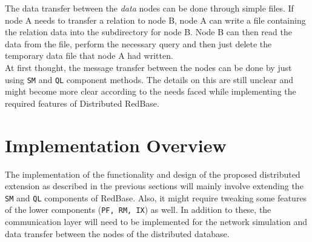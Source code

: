 \documentclass[letterpaper,11pt]{article}
\begin{document}
The data transfer between the \textit{data} nodes can be done through simple files. If node A needs to
transfer a relation to node B, node A can write a file containing the relation data into the subdirectory
for node B. Node B can then read the data from the file, perform the necessary query and then just
delete the temporary data file that node A had written.\\

At first thought, the message transfer between the nodes can be done by just using \texttt{SM} and
\texttt{QL} component methods. The details on this are still unclear and might become more clear according
to the needs faced while implementing the required features of Distributed RedBase.


\section{Implementation Overview}
The implementation of the functionality and design of the proposed distributed extension as described
in the previous sections will mainly involve extending the \texttt{SM} and \texttt{QL} components of
RedBase. Also, it might require tweaking some features of the lower components (\texttt{PF, RM, IX})
as well. In addition to these, the communication layer will need to be implemented for the network
simulation and data transfer between the nodes of the distributed database.
\end{document}
